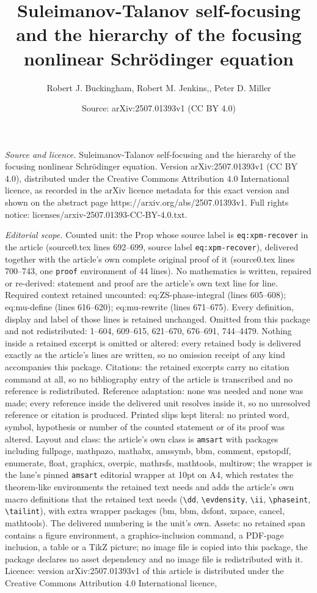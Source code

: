 \documentclass[10pt,a4paper]{amsart}
\title[Suleimanov-Talanov self-focusing and the hierarchy of the fo]{Suleimanov-Talanov self-focusing and the hierarchy of the focusing nonlinear Schr\"odinger equation}
\author{Robert J. Buckingham, Robert M. Jenkins,, Peter D. Miller}
\date{Source: arXiv:2507.01393v1 (CC BY 4.0)}
\begin{document}
\maketitle

\noindent\emph{Source and licence.} Suleimanov-Talanov self-focusing and the hierarchy of the focusing nonlinear Schr\"odinger equation. Version arXiv:2507.01393v1 (CC BY 4.0), distributed under the Creative Commons Attribution 4.0 International licence, as recorded in the arXiv licence metadata for this exact version and shown on the abstract page https://arxiv.org/abs/2507.01393v1. Full rights notice: licenses/arxiv-2507.01393-CC-BY-4.0.txt.\par\smallskip

\noindent\textit{Editorial scope.} Counted unit: the Prop whose source label is \texttt{eq:xpm-recover} in the article (source0.tex lines 692--699, source label \texttt{eq:xpm-recover}), delivered together with the article's own complete original proof of it (source0.tex lines 700--743, one \texttt{proof} environment of 44 lines). No mathematics is written, repaired or re-derived: statement and proof are the article's own text line for line. Required context retained uncounted: eq:ZS-phase-integral (lines 605--608); eq:mu-define (lines 616--620); eq:mu-rewrite (lines 671--675). Every definition, display and label of those lines is retained unchanged. Omitted from this package and not redistributed: 1--604, 609--615, 621--670, 676--691, 744--4479. Nothing inside a retained excerpt is omitted or altered: every retained body is delivered exactly as the article's lines are written, so no omission receipt of any kind accompanies this package. Citations: the retained excerpts carry no citation command at all, so no bibliography entry of the article is transcribed and no reference is redistributed. Reference adaptation: none was needed and none was made; every reference inside the delivered unit resolves inside it, so no unresolved reference or citation is produced. Printed slips kept literal: no printed word, symbol, hypothesis or number of the counted statement or of its proof was altered. Layout and class: the article's own class is \texttt{amsart} with packages including fullpage, mathpazo, mathabx, amssymb, bbm, comment, epstopdf, enumerate, float, graphicx, overpic, mathrsfs, mathtools, multirow; the wrapper is the lane's pinned \texttt{amsart} editorial wrapper at 10pt on A4, which restates the theorem-like environments the retained text needs and adds the article's own macro definitions that the retained text needs (\texttt{\textbackslash dd}, \texttt{\textbackslash evdensity}, \texttt{\textbackslash ii}, \texttt{\textbackslash phaseint}, \texttt{\textbackslash tailint}), with extra wrapper packages (bm, bbm, dsfont, xspace, cancel, mathtools). The delivered numbering is the unit's own. Assets: no retained span contains a figure environment, a graphics-inclusion command, a PDF-page inclusion, a table or a TikZ picture; no image file is copied into this package, the package declares no asset dependency and no image file is redistributed with it. Licence: version arXiv:2507.01393v1 of this article is distributed under the Creative Commons Attribution 4.0 International licence, 
\end{document}
